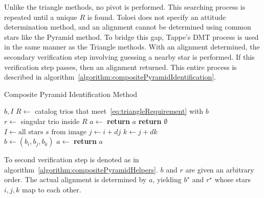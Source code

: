 Unlike the triangle methods, no pivot is performed.
This searching process is repeated until a unique $R$ is found.
Toloei does not specify an attitude determination method, and an alignment cannot be determined using common
stars like the Pyramid method.
To bridge this gap, Tappe's DMT process is used in the same manner as the Triangle methods.
With an alignment determined, the secondary verification step involving guessing a nearby star is performed.
If this verification step passes, then an alignment returned.
This entire process is described in algorithm~\ref{algorithm:compositePyramidIdentification}.

\begin{algorithm}
    \caption{Composite Pyramid Identification Method} \label{algorithm:compositePyramidIdentification}
    \begin{algorithmic}[1]
         {$b, I$}
        \State $R \gets $ catalog trios that meet~\eqref{eq:triangleRequirement} with $b$
        \\
        \State $r \gets $ singular trio inside $R$
        \State $a \gets $ 
        \State \textbf{return} $a$
        \EndIf
        \EndIf
        \State \textbf{return } $\emptyset$
        \EndFunction
        \\
        \State $I \gets \text{all stars } s \text{ from image}$
        \State $j \gets i + dj$
        \State $k \gets j + dk$
        \\
        \State $b \gets (b_i, b_j, b_k)$
        \State $a \gets$ 
        \State \textbf{return} $a$
        \EndIf
        \EndFor
        \EndFor
        \EndFor
        \EndProcedure
    \end{algorithmic}
\end{algorithm}

To second verification step is denoted as  in
algorithm~\ref{algorithm:compositePyramidHelpers}.
$b$ and $r$ are given an arbitrary order.
The actual alignment is determined by $a$, yielding $b^{\star}$ and $r^{\star}$ whose stars $i, j, k$ map to each other.

